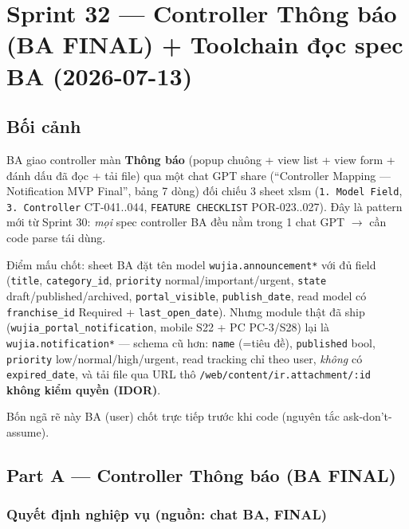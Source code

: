 \chapter{Sprint 32 --- Controller Thông báo (BA FINAL) + Toolchain đọc spec BA (2026-07-13)}

\section{Bối cảnh}

BA giao controller màn \textbf{Thông báo} (popup chuông + view list + view form + đánh dấu đã
đọc + tải file) qua một chat GPT share (``Controller Mapping --- Notification MVP Final'',
bảng 7 dòng) đối chiếu 3 sheet xlsm (\texttt{1. Model Field}, \texttt{3. Controller} CT-041..044,
\texttt{FEATURE CHECKLIST} POR-023..027). Đây là pattern mới từ Sprint 30: \emph{mọi} spec
controller BA đều nằm trong 1 chat GPT $\rightarrow$ cần code parse tái dùng.

Điểm mấu chốt: sheet BA đặt tên model \texttt{wujia.announcement*} với đủ field
(\texttt{title}, \texttt{category\_id}, \texttt{priority} normal/important/urgent, \texttt{state}
draft/published/archived, \texttt{portal\_visible}, \texttt{publish\_date}, read model có
\texttt{franchise\_id} Required + \texttt{last\_open\_date}). Nhưng module thật đã ship
(\texttt{wujia\_portal\_notification}, mobile S22 + PC PC-3/S28) lại là \texttt{wujia.notification*}
--- schema cũ hơn: \texttt{name} (=tiêu đề), \texttt{published} bool, \texttt{priority}
low/normal/high/urgent, read tracking chỉ theo user, \emph{không} có \texttt{expired\_date}, và
tải file qua URL thô \texttt{/web/content/ir.attachment/:id} \textbf{không kiểm quyền (IDOR)}.

Bốn ngã rẽ này BA (user) chốt trực tiếp trước khi code (nguyên tắc ask-don't-assume).

\section{Part A --- Controller Thông báo (BA FINAL)}

\subsection{Quyết định nghiệp vụ (nguồn: chat BA, FINAL)}

